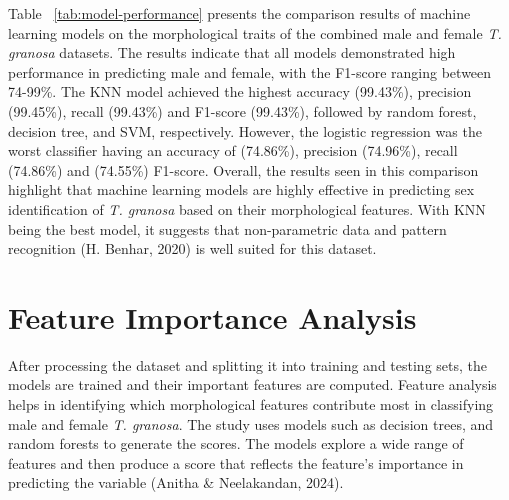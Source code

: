 \begin{table}[H]
	\centering
	\caption{Model Performance Comparison}
	\label{tab:model-performance}
\end{table}

Table ~\ref{tab:model-performance} presents the comparison results of machine learning models on the morphological traits of the combined  male and female \textit{T. granosa} datasets. The results indicate that all models demonstrated high performance in predicting male and female, with the F1-score ranging between 74-99\%. The KNN model achieved the highest accuracy (99.43\%), precision (99.45\%), recall (99.43\%) and F1-score (99.43\%), followed by random forest, decision tree, and SVM, respectively. However, the logistic regression was the worst classifier having an accuracy of (74.86\%), precision (74.96\%), recall (74.86\%) and (74.55\%) F1-score. Overall, the results seen in this comparison highlight that machine learning models are highly effective in predicting sex identification of \textit{T. granosa} based on their morphological features. With KNN being the best model, it suggests that non-parametric data and pattern recognition (H. Benhar, 2020) is well suited for this dataset. 

\section{Feature Importance Analysis}
After processing the dataset and splitting it into training and testing sets, the models are trained and their important features are computed. Feature analysis helps in identifying which morphological features contribute most in classifying male and female \textit{T. granosa}. The study uses models such as decision trees, and random forests to generate the scores. The models explore a wide range of features and then produce a score that reflects the feature’s importance in predicting the variable (Anitha \& Neelakandan, 2024).  

